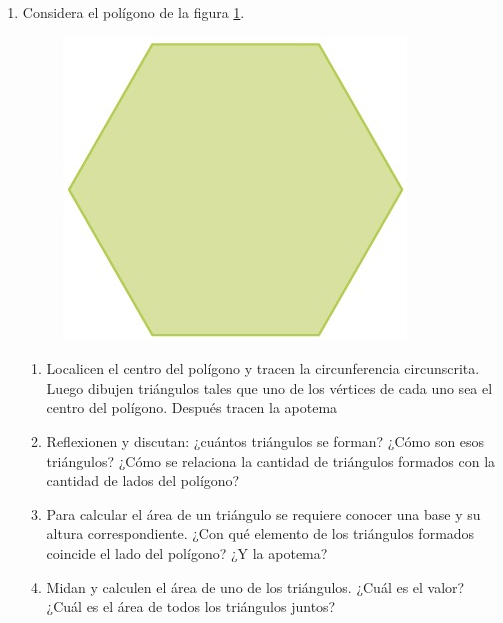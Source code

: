 \documentclass[11pt]{book}
\begin{document}
\begin{enumerate}
        \newpage

  \item Considera el polígono de la figura \ref{fig:10}.

        \begin{minipage}[t]{0.35\textwidth}
          \begin{figure}[H]
            \centering
            \includegraphics[width=\linewidth]{10.jpg}
            \label{fig:10}
          \end{figure}
        \end{minipage}\hfill
        \begin{minipage}[t]{0.55\textwidth}
          \begin{enumerate}
            \item Localicen el centro del polígono y tracen la circunferencia circunscrita. Luego dibujen triángulos tales que uno de los vértices de cada uno sea el centro del polígono. Después tracen la apotema
            \item Reflexionen y discutan: ¿cuántos triángulos se forman? ¿Cómo son esos triángulos? ¿Cómo se relaciona la cantidad de triángulos formados con la cantidad de lados del polígono?
            \item Para calcular el área de un triángulo se requiere conocer una base y su altura correspondiente. ¿Con qué elemento de los triángulos formados coincide el lado del polígono? ¿Y la apotema?
            \item Midan y calculen el área de uno de los triángulos. ¿Cuál es el valor? ¿Cuál es el área de todos los triángulos juntos?

\end{enumerate}
\end{minipage}
\end{enumerate}
\end{document}
